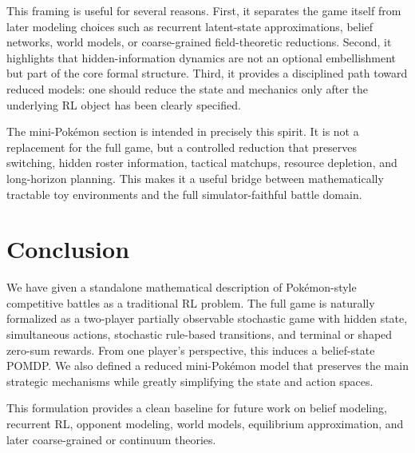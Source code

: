 \documentclass[aps,pre,twocolumn,superscriptaddress,nofootinbib]{revtex4-2}
\theoremstyle{definition}
\theoremstyle{plain}
\begin{document}
This framing is useful for several reasons. First, it separates the game itself from later modeling choices such as recurrent latent-state approximations, belief networks, world models, or coarse-grained field-theoretic reductions. Second, it highlights that hidden-information dynamics are not an optional embellishment but part of the core formal structure. Third, it provides a disciplined path toward reduced models: one should reduce the state and mechanics only after the underlying RL object has been clearly specified.

The mini-Pok\'emon section is intended in precisely this spirit. It is not a replacement for the full game, but a controlled reduction that preserves switching, hidden roster information, tactical matchups, resource depletion, and long-horizon planning. This makes it a useful bridge between mathematically tractable toy environments and the full simulator-faithful battle domain.

\section{Conclusion}

We have given a standalone mathematical description of Pok\'emon-style competitive battles as a traditional RL problem. The full game is naturally formalized as a two-player partially observable stochastic game with hidden state, simultaneous actions, stochastic rule-based transitions, and terminal or shaped zero-sum rewards. From one player's perspective, this induces a belief-state POMDP. We also defined a reduced mini-Pok\'emon model that preserves the main strategic mechanisms while greatly simplifying the state and action spaces.

This formulation provides a clean baseline for future work on belief modeling, recurrent RL, opponent modeling, world models, equilibrium approximation, and later coarse-grained or continuum theories.
\end{document}
